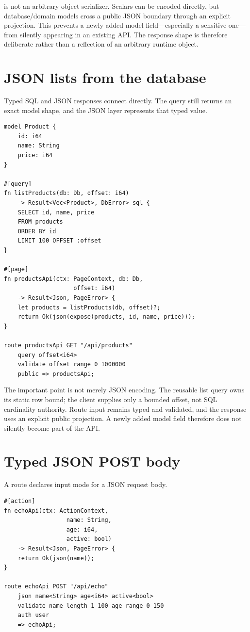  is not an arbitrary object serializer. Scalars can be encoded directly, but database/domain models cross a public JSON boundary through an explicit  projection. This prevents a newly added model field---especially a sensitive one---from silently appearing in an existing API. The response shape is therefore deliberate rather than a reflection of an arbitrary runtime object.

\section{JSON lists from the database}

Typed SQL and JSON responses connect directly. The query still returns an exact model shape, and the JSON layer represents that typed value.

\begin{lstlisting}[language=Velran]
model Product {
    id: i64
    name: String
    price: i64
}

#[query]
fn listProducts(db: Db, offset: i64)
    -> Result<Vec<Product>, DbError> sql {
    SELECT id, name, price
    FROM products
    ORDER BY id
    LIMIT 100 OFFSET :offset
}

#[page]
fn productsApi(ctx: PageContext, db: Db,
                    offset: i64)
    -> Result<Json, PageError> {
    let products = listProducts(db, offset)?;
    return Ok(json(expose(products, id, name, price)));
}

route productsApi GET "/api/products"
    query offset<i64>
    validate offset range 0 1000000
    public => productsApi;
\end{lstlisting}

The important point is not merely JSON encoding. The reusable list query owns its static row bound; the client supplies only a bounded offset, not SQL cardinality authority. Route input remains typed and validated, and the response uses an explicit public projection. A newly added model field therefore does not silently become part of the API.

\section{Typed JSON POST body}

A route declares  input mode for a JSON request body.

\begin{lstlisting}[language=Velran]
#[action]
fn echoApi(ctx: ActionContext,
                  name: String,
                  age: i64,
                  active: bool)
    -> Result<Json, PageError> {
    return Ok(json(name));
}

route echoApi POST "/api/echo"
    json name<String> age<i64> active<bool>
    validate name length 1 100 age range 0 150
    auth user
    => echoApi;
\end{lstlisting}

